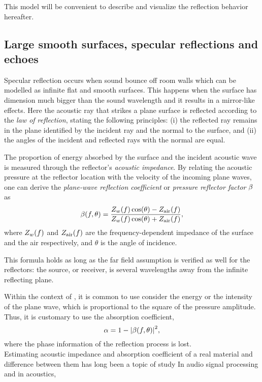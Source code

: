 This model will be convenient to describe and visualize the reflection behavior hereafter.

\subsection{Large smooth surfaces, specular reflections and echoes}
Specular reflection occurs when sound bounce off room walls which can be modelled as infinite flat and smooth surfaces.
This happens when the surface has dimension much bigger than the sound wavelength and it results in a mirror-like effects.
Here the acoustic ray that strikes a plane surface is reflected according to the \textit{law of reflection}, stating the following principles:
(i) the reflected ray remains in the plane identified by the incident ray and the normal to the surface,
and (ii) the angles of the incident and reflected rays with the normal are equal.

The proportion of energy absorbed by the surface and the incident acoustic wave is measured
through the reflector's \textit{acoustic impedance}.
By relating the acoustic pressure at the reflector location with the velocity of the incoming plane waves,
one can derive the \textit{plane-wave reflection coefficient} or \textit{pressure reflector factor} $\beta$ \cite{kuttruff} as
\begin{equation}
    \beta(f, \theta) = \frac{Z_w(f)\cos(\theta) - Z_\text{air}(f)}{Z_w(f)\cos(\theta) + Z_\text{air}(f)}
    ,
\end{equation}
where $Z_w(f)$ and $Z_\text{air}(f)$ are the frequency-dependent impedance of the surface and the air respectively,
and $\theta$ is the angle of incidence.

This formula holds as long as the far field assumption is verified as well for the reflectors:
the source, or receiver, is several wavelengths away from the infinite reflecting plane.

Within the context of \GA, it is common to use consider the energy or the intensity of the plane wave, which is
proportional to the square of the pressure amplitude. Thus, it is customary to use the absorption coefficient,
\begin{equation}
    \absCoeff = 1 - \abs{\reflCoeff(f, \theta)}^2
    ,
\end{equation}
where the phase information of the reflection process is lost.
\\Estimating acoustic impedance and absorption coefficient of a real material and difference between them has long been a topic of study
In audio signal processing and in acoustics,

